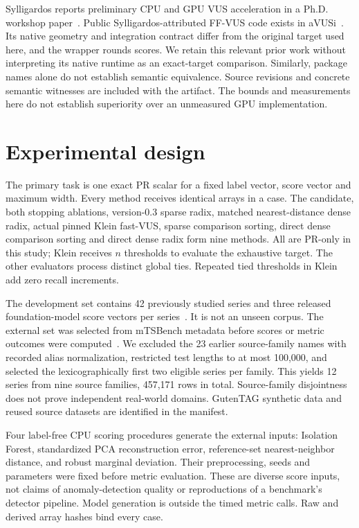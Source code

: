 Sylligardos reports preliminary CPU and GPU VUS acceleration in a Ph.D.
workshop paper~\cite{sylligardos2025}. Public Sylligardos-attributed FF-VUS
code exists in aVUSi~\cite{ffvus2026}. Its native geometry and integration
contract differ from the original target used here, and the wrapper rounds
scores. We retain this relevant prior work without interpreting its native
runtime as an exact-target comparison. Similarly, package names alone do not
establish semantic equivalence. Source revisions and concrete semantic
witnesses are included with the artifact. The bounds and measurements here
do not establish superiority over an unmeasured GPU implementation.

\section{Experimental design}
The primary task is one exact PR scalar for a fixed label vector, score
vector and maximum width. Every method receives identical arrays in a case.
The candidate, both stopping ablations, version-0.3 sparse radix, matched
nearest-distance dense radix, actual pinned Klein fast-VUS, sparse comparison
sorting, direct dense comparison sorting and direct dense radix form nine
methods. All are PR-only in this study; Klein receives $n$ thresholds to
evaluate the exhaustive target. The other evaluators process distinct global
ties. Repeated tied thresholds in Klein add zero recall increments.

The development set contains 42 previously studied series and three released
foundation-model score vectors per series~\cite{zhu2026}. It is not an unseen
corpus. The external set was selected from mTSBench metadata before scores
or metric outcomes were computed~\cite{mtsbench}. We excluded the 23 earlier
source-family names with recorded alias normalization, restricted test
lengths to at most 100,000, and selected the lexicographically first two
eligible series per family. This yields 12 series from nine source families,
457,171 rows in total. Source-family disjointness does not prove independent
real-world domains. GutenTAG synthetic data and reused source
datasets are identified in the manifest.

Four label-free CPU scoring procedures generate the external inputs:
Isolation Forest, standardized PCA reconstruction error, reference-set
nearest-neighbor distance, and robust marginal deviation. Their preprocessing,
seeds and parameters were fixed before metric evaluation. These are diverse
score inputs, not claims of anomaly-detection quality or reproductions of a
benchmark's detector pipeline. Model generation is outside the timed metric
calls. Raw and derived array hashes bind every case.

